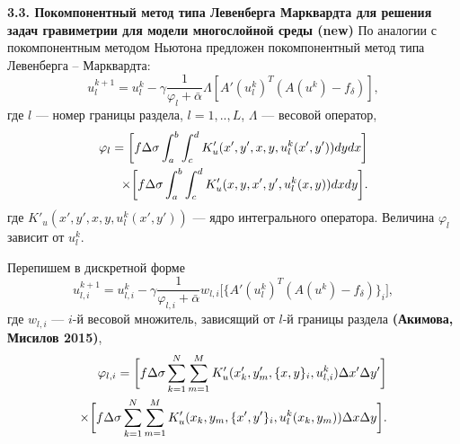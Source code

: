\documentclass[10pt,pdf, mathserif, hyperref={unicode}]{beamer}
\begin{document}
\begin{frame}{\small\textbf{3.3. Покомпонентный метод типа Левенберга Марквардта для решения задач гравиметрии для модели многослойной среды \textbf{(new)}}}
	По аналогии с покомпонентным методом Ньютона предложен покомпонентный метод типа Левенберга -- Марквардта:
	\begin{equation}\label{comp_lm_meth}
	u_l^{k+1}=u_l^k-\gamma\frac{1}{\varphi_l+\bar{\alpha}}\Lambda[ A'(u_l^k)^T(A(u^k)-f_\delta)],
	\end{equation}
	где $l$ --- номер границы раздела, $l=1,..,L$, $\Lambda$ --- весовой оператор, 
	\begin{equation*}
	\begin{aligned}
	\varphi_l=\bigg[ f\Delta\sigma\int_{a}^{b}\int_{c}^{d}
	K'_u(x',y', x, y, u_l^k(x',y'))dydx\bigg] \notag \\ \times\bigg[f\Delta\sigma\int_{a}^{b}\int_{c}^{d}K'_u(x,y, x',y',u_l^k(x,y))dxdy\bigg]. 
	\end{aligned}
	\end{equation*} 
	где $K'_u(x',y', x, y, u_l^k(x',y'))$ --- ядро интегрального оператора. %
	 Величина $\varphi_l$ зависит от $u_l^k$.
	\let\thefootnote\relax\let\thefootnote\relax{}

\end{frame}
\begin{frame}
	Перепишем в дискретной форме
	\begin{equation}\label{comp_lm_meth_disc}
	u_{l,i}^{k+1}=u_{l,i}^k-\gamma\frac{1}{\varphi_{l,i}+\bar{\alpha}}w_{l,i}\bigg[ \{A'(u_l^k)^T(A(u^k)-f_\delta)\}_i\bigg],
	\end{equation}
	где $w_{l,i}$ --- $i$-й весовой множитель, зависящий от $l$-й границы раздела \textbf{\color{red}(Акимова, Мисилов 2015)},
	\begin{equation*}
	\begin{aligned}
	\varphi_{l,i}=\bigg[ f\Delta\sigma\sum\limits_{k=1}^{N}
	\sum\limits_{m=1}^{M}
	K'_u(x'_k,y'_m, \{x, y\}_i, u_{l,i}^k) \Delta x' \Delta y'\bigg] \notag \\ \times\bigg[f\Delta\sigma\sum\limits_{k=1}^{N}
	\sum\limits_{m=1}^{M}K'_u(x_k,y_m, \{x',y'\}_i,u_l^k(x_k,y_m))\Delta x \Delta y\bigg]. 
	\end{aligned}
	\end{equation*}
	\let\thefootnote\relax\let\thefootnote\relax{}
\end{frame}
\end{document}
